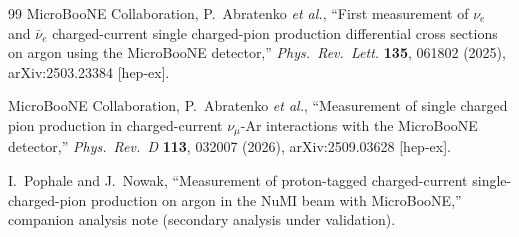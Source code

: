\documentclass[11pt,a4paper]{article}
\newcommand{\uboone}{MicroBooNE}
\begin{document}
\begin{thebibliography}{99}
  MicroBooNE Collaboration, P.~Abratenko \textit{et al.},
  ``First measurement of $\nu_e$ and $\bar{\nu}_e$ charged-current single
  charged-pion production differential cross sections on argon using the
  MicroBooNE detector,''
  \textit{Phys.\ Rev.\ Lett.} \textbf{135}, 061802 (2025),
  arXiv:2503.23384 [hep-ex].

  MicroBooNE Collaboration, P.~Abratenko \textit{et al.},
  ``Measurement of single charged pion production in charged-current
  $\nu_\mu$-Ar interactions with the MicroBooNE detector,''
  \textit{Phys.\ Rev.\ D} \textbf{113}, 032007 (2026),
  arXiv:2509.03628 [hep-ex].

 I.~Pophale and J.~Nowak, ``Measurement of proton-tagged charged-current
  single-charged-pion production on argon in the NuMI beam with \uboone{},'' companion analysis
  note (secondary analysis under validation).

\end{thebibliography}
\end{document}
